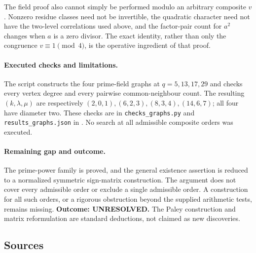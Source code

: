 \documentclass[11pt,a4paper]{article}
\begin{document}
The field proof also cannot simply be performed modulo an arbitrary
composite $v$. Nonzero residue classes need not be invertible, the
quadratic character need not have the two-level correlations used
above, and the factor-pair count for $a^2$ changes when $a$ is a
zero divisor. The exact identity, rather than only the congruence
$v\equiv1\pmod4$, is the operative ingredient of that proof.

\paragraph{Executed checks and limitations.}
The script constructs the four prime-field graphs at $q=5,13,17,29$
and checks every vertex degree and every pairwise common-neighbour
count. The resulting $(k,\lambda,\mu)$ are respectively
$(2,0,1),(6,2,3),(8,3,4),(14,6,7)$; all four have diameter two.
These checks are in \texttt{checks\_graphs.py} and
\texttt{results\_graphs.json} in
.
No search at all admissible composite orders was executed.

\paragraph{Remaining gap and outcome.}
The prime-power family is proved, and the general existence assertion
is reduced to a normalized symmetric sign-matrix construction. The
argument does not cover every admissible order or exclude a single
admissible order. A construction for all such orders, or a rigorous
obstruction beyond the supplied arithmetic tests, remains missing.
\textbf{Outcome: UNRESOLVED.} The Paley construction and matrix
reformulation are standard deductions, not claimed as new discoveries.

\subsection{Sources}
\end{document}
